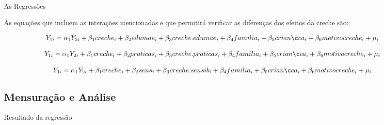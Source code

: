 \documentclass[10pt]{Beamer}
\begin{document}
\begin{frame}{As Regressões}

\begin{itemize}

\begin{block}

\item As equações que incluem as interações mencionadas e que permitirá verificar as diferenças dos efeitos da creche são:

\end{block}

\end{itemize}

\begin{equation}
Y_{1i} = \alpha_1Y_{2i} + \beta_1creche_i + \beta_2edumae_i + \beta_3creche.edumae_i + \beta_4familia_i \\ + \beta_5criança_i + \beta_6motivocreche_i + \mu_i
\end{equation}

\begin{equation}
Y_{1i} = \alpha_1Y_{2i} + \beta_1creche_i + \beta_2praticas_i + \beta_3creche.praticas_i + \beta_4familia_i \\ + \beta_5criança_i + \beta_6motivocreche_i + \mu_i
\end{equation}

\begin{equation}
Y_{1i} = \alpha_1Y_{2i} + \beta_1creche_i + \beta_2sens_i + \beta_3creche.sensib_i + \beta_4familia_i \\ + \beta_5criança_i + \beta_6motivocreche_i + \mu_i
\end{equation}

\end{frame}



	\subsection{Mensuração e Análise}
	
\begin{frame}{Resultado da regressão}
		
\end{frame}
	
\end{document}
